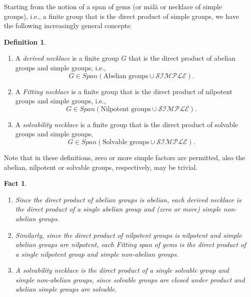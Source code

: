 \documentclass[a4paper,11pt]{amsart}
\newtheorem{fact}[theorem]{Fact}
\theoremstyle{definition}
\newtheorem{definition}[theorem]{Definition}
\newcommand{\1}{{\mathbf 1}}
\newcommand{\SIMPLE}{{\mathscr{SIMPLE}}}
\newcommand{\Span}{Span}
\begin{document}
Starting from the notion of a span of gems (or m\={a}l\={a} or necklace of simple groups), i.e., a finite group  that is the direct product of  simple groups, we have the following increasingly general concepts: 
\begin{definition}\begin{enumerate}
    \item  A {\em derived necklace} is a finite group $G$ that is the direct product of abelian groups and simple groups, i.e., $$G \in \Span(\mbox{Abelian groups} \cup \SIMPLE).$$
\item A {\em Fitting necklace} is a finite group that is the direct product of nilpotent groups and simple groups, i.e., $$G \in \Span(\mbox{Nilpotent groups} \cup \SIMPLE).$$
\item A {\em solvability necklace} is a finite group that is the direct product of solvable groups and simple groups, $$G \in \Span(\mbox{Solvable groups} \cup \SIMPLE).$$
\end{enumerate}
\end{definition}
Note that in these definitions, zero or more simple factors are permitted, also the abelian, nilpotent or solvable groups, respectively, may be trivial.  

\begin{fact}\label{product}
\begin{enumerate}
    \item 
Since the direct product of abelian groups is abelian, each derived necklace is the direct product of a single abelian group and (zero or more) simple non-abelian groups. 
\item 
Similarly, since the direct product of nilpotent groups is nilpotent and simple abelian groups are nilpotent, each Fitting span of gems is the direct product of a single nilpotent group and  simple non-abelian groups. 
\item A solvability necklace is the direct product of a single solvable group and simple non-abelian groups, since solvable groups are closed under product and abelian simple groups are solvable. 
\end{enumerate}
\end{fact}
\end{document}
